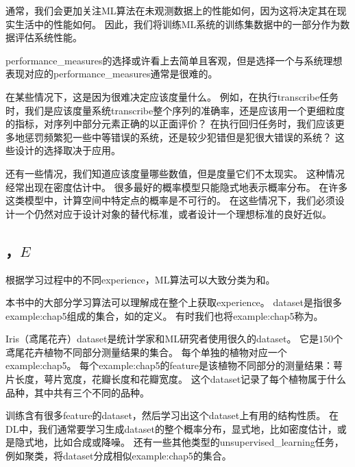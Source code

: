 
通常，我们会更加关注\gls{ML}算法在未观测数据上的性能如何，因为这将决定其在现实生活中的性能如何。
因此，我们将训练\gls{ML}系统的训练集数据中的一部分作为数据评估系统性能。

\gls{performance_measures}的选择或许看上去简单且客观，但是选择一个与系统理想表现对应的\gls{performance_measures}通常是很难的。

在某些情况下，这是因为很难决定应该度量什么。
例如，在执行\gls{transcribe}任务时，我们是应该度量系统\gls{transcribe}整个序列的准确率，还是应该用一个更细粒度的指标，对序列中部分元素正确的以正面评价？
在执行回归任务时，我们应该更多地惩罚频繁犯一些中等错误的系统，还是较少犯错但是犯很大错误的系统？
这些设计的选择取决于应用。

还有一些情况，我们知道应该度量哪些数值，但是度量它们不太现实。
这种情况经常出现在密度估计中。
很多最好的概率模型只能隐式地表示概率分布。
在许多这类模型中，计算空间中特定点的概率是不可行的。
在这些情况下，我们必须设计一个仍然对应于设计对象的替代标准，或者设计一个理想标准的良好近似。

\subsection{，$E$}
\label{sec:the_experience_e}
根据学习过程中的不同\gls{experience}，\gls{ML}算法可以大致分类为和。

本书中的大部分学习算法可以理解成在整个上获取\gls{experience}。
\gls{dataset}是指很多\gls{example:chap5}组成的集合，如的定义。
有时我们也将\gls{example:chap5}称为。


Iris（鸢尾花卉）\gls{dataset}\citep{Fisher-1936}是统计学家和\gls{ML}研究者使用很久的\gls{dataset}。
它是$150$个鸢尾花卉植物不同部分测量结果的集合。
每个单独的植物对应一个\gls{example:chap5}。
每个\gls{example:chap5}的\gls{feature}是该植物不同部分的测量结果：萼片长度，萼片宽度，花瓣长度和花瓣宽度。
这个\gls{dataset}记录了每个植物属于什么品种，其中共有三个不同的品种。

训练含有很多\gls{feature}的\gls{dataset}，然后学习出这个\gls{dataset}上有用的结构性质。
在\gls{DL}中，我们通常要学习生成\gls{dataset}的整个概率分布，显式地，比如密度估计，或是隐式地，比如合成或降噪。
还有一些其他类型的\gls{unsupervised_learning}任务，例如聚类，将\gls{dataset}分成相似\gls{example:chap5}的集合。

